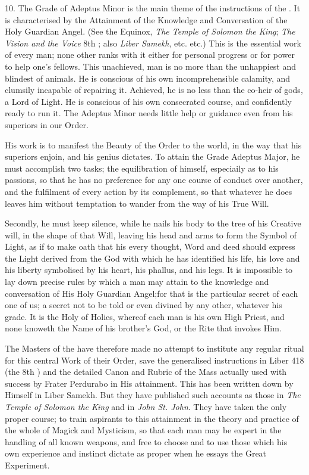 \vspace{\baselineskip}

10. The Grade of Adeptus Minor is the main theme of the instructions of the \Argentium{}. It is characterised by the Attainment of the Knowledge and Conversation of the Holy Guardian Angel. (See the Equinox, \textit{The Temple of Solomon the King}; \textit{The Vision and the Voice} 8th \AEthyr{}; also \textit{Liber Samekh}, etc. etc.) This is the essential work of every man; none other ranks with it either for personal progress or for power to help one's fellows. This unachieved, man is no more than the unhappiest and blindest of animals. He is conscious of his own incomprehensible calamity, and clumsily incapable of repairing it. Achieved, he is no less than the co-heir of gods, a Lord of Light. He is conscious of his own consecrated course, and confidently ready to run it. The Adeptus Minor needs little help or guidance even from his superiors in our Order.

His work is to manifest the Beauty of the Order to the world, in the way that his superiors enjoin, and his genius dictates. To attain the Grade Adeptus Major, he must accomplish two tasks; the equilibration of himself, especiaily as to his passions, so that he has no preference for any one course of conduct over another, and the fulfilment of every action by its complement, so that whatever he does leaves him without temptation to wander from the way of his True Will.

Secondly, he must keep silence, while he nails his body to the tree of his Creative will, in the shape of that Will, leaving his head and arms to form the Symbol of Light, as if to make oath that his every thought, Word and deed should express the Light derived from the God with which he has identified his life, his love and his liberty \textemdash{} symbolised by his heart, his phallus, and his legs. It is impossible to lay down precise rules by which a man may attain to the knowledge and conversation of His Holy Guardian Angel;for that is the particular secret of each one of us; a secret not to be told or even divined by any other, whatever his grade. It is the Holy of Holies, whereof each man is his own High Priest, and none knoweth the Name of his brother's God, or the Rite that invokes Him.

The Masters of the \Argentium{} have therefore made no attempt to institute any regular ritual for this central Work of their Order, save the generalised instructions in Liber 418 (the 8th \AEthyr{}) and the detailed Canon and Rubric of the Mass actually used with success by Frater Perdurabo in His attainment. This has been written down by Himself in Liber Samekh. But they have published such accounts as those in \textit{The Temple of Solomon the King} and in \textit{John St. John}. They have taken the only proper course; to train aspirants to this attainment in the theory and practice of the whole of Magick and Mysticism, so that each man may be expert in the handling of all known weapons, and free to choose and to use those which his own experience and instinct dictate as proper when he essays the Great Experiment.

